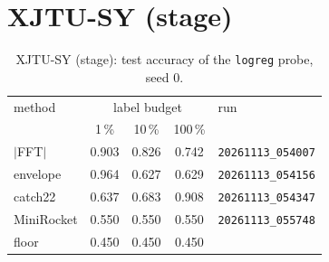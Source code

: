 \section{XJTU-SY (stage)}
\begin{table}[h]
\centering
\begin{tabular}{lcccl}
\toprule
method & \multicolumn{3}{c}{label budget} & run \\
 & 1\,\% & 10\,\% & 100\,\% & \\
\midrule
$|$FFT$|$ & 0.903 & 0.826 & 0.742 & \texttt{\footnotesize 20261113\_054007} \\
envelope & 0.964 & 0.627 & 0.629 & \texttt{\footnotesize 20261113\_054156} \\
catch22 & 0.637 & 0.683 & 0.908 & \texttt{\footnotesize 20261113\_054347} \\
MiniRocket & 0.550 & 0.550 & 0.550 & \texttt{\footnotesize 20261113\_055748} \\
\midrule
floor & 0.450 & 0.450 & 0.450 & \\
\bottomrule
\end{tabular}
\caption{XJTU-SY (stage): test accuracy of the \texttt{logreg} probe, seed 0.}
\end{table}


